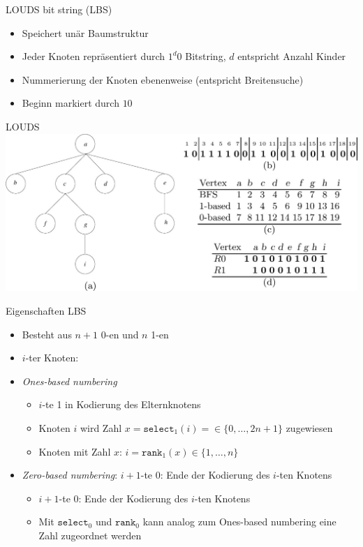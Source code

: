 \documentclass[ngerman,aspectratio=169,10pt]{beamer}
\begin{document}
\begin{frame}{LOUDS bit string (LBS)}
    \begin{itemize}
        \item Speichert unär Baumstruktur
        \item Jeder Knoten repräsentiert durch $1^d0$ Bitstring, $d$ entspricht Anzahl Kinder
        \item Nummerierung der Knoten ebenenweise (entspricht Breitensuche)
        \item Beginn markiert durch $10$
    \end{itemize}
\end{frame}

\begin{frame}{LOUDS}
    \includegraphics[width=1.0\textwidth]{LOUDS.jpg}
\end{frame}

\begin{frame}{Eigenschaften LBS}
    \begin{itemize}
        \item Besteht aus $n+1$ 0-en und $n$ 1-en
        \item $i$-ter Knoten:
        \item \textit{Ones-based numbering}
        \begin{itemize}
            \item $i$-te 1 in Kodierung des Elternknotens
            \item Knoten $i$ wird Zahl $x=\texttt{select}_1(i)=\in\{0,\ldots,2n+1\}$ zugewiesen
            \item Knoten mit Zahl $x$: $i=\texttt{rank}_1(x)\in\{1,\ldots,n\}$
        \end{itemize}
        \item \textit{Zero-based numbering}: $i+1$-te 0: Ende der Kodierung des $i$-ten Knotens
        \begin{itemize}
            \item $i+1$-te 0: Ende der Kodierung des $i$-ten Knotens
            \item Mit $\texttt{select}_0$ und $\texttt{rank}_0$ kann analog zum Ones-based numbering eine Zahl zugeordnet werden
        \end{itemize}
    \end{itemize}
\end{frame}
\end{document}
